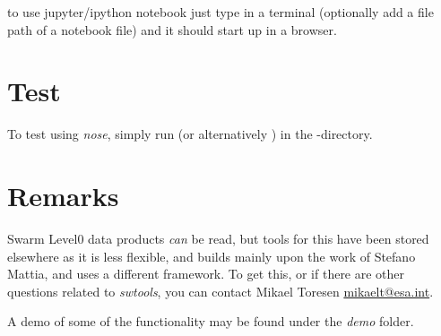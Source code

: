 \documentclass[letterpaper,10pt,english]{sphinxhowto}
\begin{document}
to use jupyter/ipython notebook just type  in a terminal (optionally add a file path of a notebook file) and it should start up in a browser.


\section{Test}
\label{test::doc}\label{test:test}\label{test:id1}
To test  using \emph{nose}, simply run  (or alternatively  ) in the -directory.


\section{Remarks}
\label{remarks:remarks}\label{remarks::doc}
Swarm Level0 data products \emph{can} be read, but tools for this have been stored elsewhere as it is less flexible, and builds mainly upon the work of Stefano Mattia, and uses a different framework. To get this, or if there are other questions related to \emph{swtools}, you can contact Mikael Toresen \href{mailto:mikaelt@esa.int}{mikaelt@esa.int}.

A demo of some of the functionality may be found under the \emph{demo} folder.



\renewcommand{\indexname}{Index}
\printindex
\end{document}
